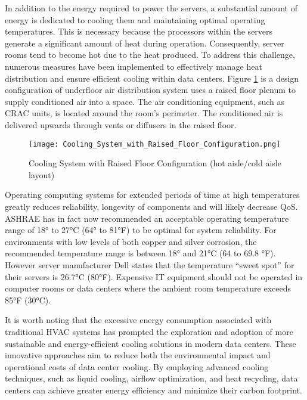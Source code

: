 \documentclass[
  a4paper,  %
  twoside,  %
  bibliography=totoc,
  headsepline,
  cleardoublepage=empty,
  parskip=half,
  draft=false
]{scrbook}
\begin{document}
In addition to the energy required to power the servers, a substantial amount of energy is dedicated to cooling them and maintaining optimal operating temperatures\cite{zhang2021survey}. This is necessary because the processors within the servers generate a significant amount of heat during operation. Consequently, server rooms tend to become hot due to the heat produced. To address this challenge, numerous measures have been implemented to effectively manage heat distribution and ensure efficient cooling within data centers\cite{zhang2021survey}. Figure \ref{servers_cooling_system} is a design configuration of underfloor air distribution system uses a raised floor plenum to supply conditioned air into a space. The air conditioning equipment, such as CRAC units, is located around the room's perimeter. The conditioned air is delivered upwards through vents or diffusers in the raised floor.


\begin{figure}
	\centering
	\texttt{[image: Cooling\_System\_with\_Raised\_Floor\_Configuration.png]}
	\caption{Cooling System with Raised Floor Configuration (hot aisle/cold aisle layout)\cite{bhatia2015hvac}}
	\label{servers_cooling_system}
\end{figure}

Operating computing systems for extended periods of time at high temperatures
greatly reduces reliability, longevity of components and will likely decrease QoS. ASHRAE has in fact now recommended an acceptable operating temperature range of 18° to 27°C (64° to 81°F) to be optimal for system reliability. For environments with low levels of both copper and silver corrosion, the recommended temperature range is between 18° and 21°C (64 to 69.8 °F). However server manufacturer Dell states that the temperature “sweet spot” for their servers is 26.7°C (80°F)\cite{AVTECH}. Expensive IT equipment should not be operated in computer rooms or data centers where the ambient room temperature exceeds 85°F (30°C)\cite{42U_2016}.

It is worth noting that the excessive energy consumption associated with traditional HVAC systems has prompted the exploration and adoption of more sustainable and energy-efficient cooling solutions in modern data centers\cite{nadjahi2018review}. These innovative approaches aim to reduce both the environmental impact and operational costs of data center cooling. By employing advanced cooling techniques, such as liquid cooling, airflow optimization, and heat recycling, data centers can achieve greater energy efficiency and minimize their carbon footprint.
\end{document}
